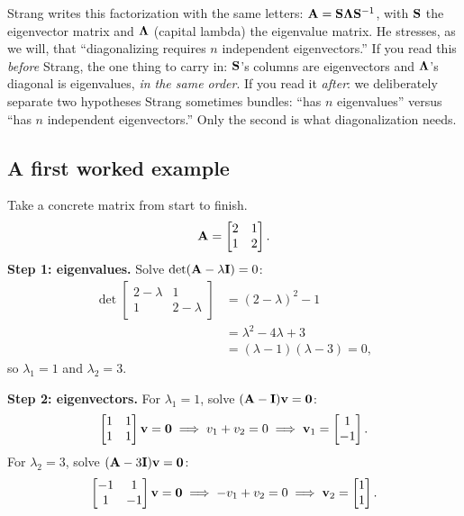\begin{strangbox}
Strang writes this factorization with the same letters: $\mathbf{A} =
\mathbf{S}\mathbf{\Lambda}\mathbf{S}^{-1}$, with $\mathbf{S}$ the eigenvector matrix and
$\mathbf{\Lambda}$ (capital lambda) the eigenvalue matrix. He stresses, as we will,
that ``diagonalizing requires $n$ independent eigenvectors.'' If you read this
\emph{before} Strang, the one thing to carry in: $\mathbf{S}$'s columns are
eigenvectors and $\mathbf{\Lambda}$'s diagonal is eigenvalues, \emph{in the same
order}. If you read it \emph{after}: we deliberately separate two
hypotheses Strang sometimes bundles: ``has $n$ eigenvalues'' versus ``has $n$
independent eigenvectors.'' Only the second is what diagonalization needs.
\end{strangbox}

\subsection{A first worked example}
\label{ch24:first-example}

Take a concrete matrix from start to finish.
\[
  \mathbf{A} = \begin{bmatrix} 2 & 1 \\ 1 & 2 \end{bmatrix}.
\]
\textbf{Step 1: eigenvalues.} Solve $\det(\mathbf{A} - \lambda\mathbf{I}) = 0$:
\begin{align*}
  \det\begin{bmatrix} 2-\lambda & 1 \\ 1 & 2-\lambda \end{bmatrix}
  &= (2-\lambda)^2 - 1 \\
  &= \lambda^2 - 4\lambda + 3 \\
  &= (\lambda - 1)(\lambda - 3) = 0,
\end{align*}
so $\lambda_1 = 1$ and $\lambda_2 = 3$.

\textbf{Step 2: eigenvectors.} For $\lambda_1 = 1$, solve $(\mathbf{A}-\mathbf{I})\mathbf{v}=\mathbf{0}$:
\[
  \begin{bmatrix} 1 & 1 \\ 1 & 1 \end{bmatrix}\mathbf{v} = \mathbf{0}
  \;\Longrightarrow\; v_1 + v_2 = 0
  \;\Longrightarrow\; \mathbf{v}_1 = \begin{bmatrix}1\\-1\end{bmatrix}.
\]
For $\lambda_2 = 3$, solve $(\mathbf{A}-3\mathbf{I})\mathbf{v}=\mathbf{0}$:
\[
  \begin{bmatrix} -1 & 1 \\ 1 & -1 \end{bmatrix}\mathbf{v} = \mathbf{0}
  \;\Longrightarrow\; -v_1 + v_2 = 0
  \;\Longrightarrow\; \mathbf{v}_2 = \begin{bmatrix}1\\1\end{bmatrix}.
\]

